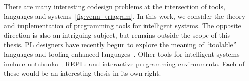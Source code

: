 There are many interesting codesign problems at the intersection of tools, languages and systems~\autoref{fig:venn_triagram}. In this work, we consider the theory and implementation of programming tools for intelligent systems. The opposite direction is also an intriguing subject, but remains outside the scope of this thesis. PL designers have recently begun to explore the meaning of ``toolable'' languages and tooling-enhanced languages~\citep{chatley2019next}. Other tools for intelligent systems include notebooks~\citep{chattopadhyays2020notebooks}, REPLs and interactive programming environments. Each of these would be an interesting thesis in its own right.

\begin{figure}

\end{figure}
